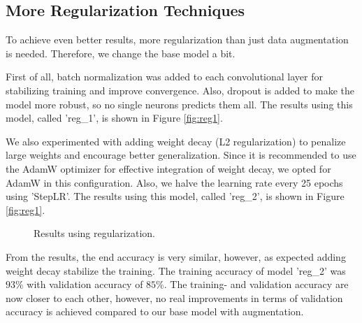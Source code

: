 \subsection{More Regularization Techniques}
To achieve even better results, more regularization than just data augmentation is needed. Therefore, we change the base model a bit.

First of all, batch normalization was added to each convolutional layer for stabilizing training and improve convergence. Also, dropout is added to make the model more robust, so no single neurons predicts them all. The results using this model, called 'reg\_1', is shown in Figure \ref{fig:reg1}.

We also experimented with adding weight decay (L2 regularization) to penalize large weights and encourage better generalization. Since it is recommended to use the AdamW optimizer for effective integration of weight decay, we opted for AdamW in this configuration. Also, we halve the learning rate every 25 epochs using 'StepLR'. The results using this model, called 'reg\_2', is shown in Figure \ref{fig:reg1}.
\begin{figure}[H]
    \vspace*{-0.7cm}
    \centering
    \hspace{1cm}
    \caption{Results using regularization.}
    \label{fig:reg}
    \vspace*{-0.7cm}
\end{figure}

From the results, the end accuracy is very similar, however, as expected adding weight decay stabilize the training. The training accuracy of model 'reg\_2' was $93\%$ with validation accuracy of $85\%$. The training- and validation accuracy are now closer to each other, however, no real improvements in terms of validation accuracy is achieved compared to our base model with augmentation.

